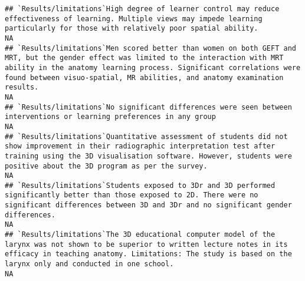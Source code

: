 \documentclass[]{article}
\begin{document}
\begin{verbatim}
## `Results/limitations`High degree of learner control may reduce effectiveness of learning. Multiple views may impede learning particularly for those with relatively poor spatial ability.                                                                                                                                                                                                                                                                                            NA
## `Results/limitations`Men scored better than women on both GEFT and MRT, but the gender effect was limited to the interaction with MRT ability in the anatomy learning process. Significant correlations were found between visuo-spatial, MR abilities, and anatomy examination results.                                                                                                                                                                                             NA
## `Results/limitations`No significant differences were seen between interventions or learning preferences in any group                                                                                                                                                                                                                                                                                                                                                                 NA
## `Results/limitations`Quantitative assessment of students did not show improvement in their radiographic interpretation test after training using the 3D visualisation software. However, students were positive about the 3D program as per the survey.                                                                                                                                                                                                                              NA
## `Results/limitations`Students exposed to 3Dr and 3D performed significantly better than those exposed to 2D. There were no significant differences between 3D and 3Dr and no significant gender differences.                                                                                                                                                                                                                                                                         NA
## `Results/limitations`The 3D educational computer model of the larynx was not shown to be superior to written lecture notes in its efficacy in teaching anatomy. Limitations: The study is based on the larynx only and conducted in one school.                                                                                                                                                                                                                                      NA

\end{verbatim}
\end{document}

